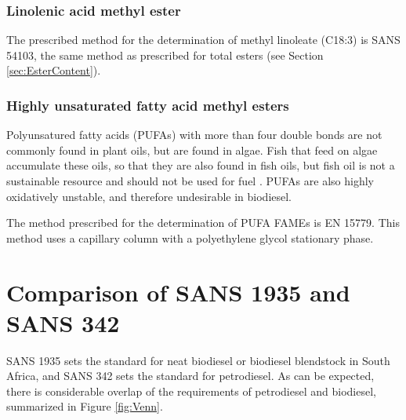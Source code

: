 \subsubsection{Linolenic acid methyl ester}

The prescribed method for the determination of methyl linoleate (C18:3) is SANS
54103, the same method as prescribed for total esters (see Section
\ref{sec:EsterContent}).

\subsubsection{Highly unsaturated fatty acid methyl esters}

Polyunsatured fatty acids (PUFAs) with more than four double bonds are not
commonly found in plant oils, but are found in algae. Fish that feed on algae
accumulate these oils, so that they are also found in fish oils, but fish oil is
not a sustainable resource and should not be used for fuel
\autocite{Kitessa2014}. PUFAs are also highly oxidatively unstable, and
therefore undesirable in biodiesel.

The method prescribed for the determination of PUFA FAMEs is EN 15779. This
method uses a capillary column with a polyethylene glycol stationary phase.

\section{Comparison of SANS 1935 and SANS 342}

SANS 1935 sets the standard for neat biodiesel or biodiesel blendstock in South
Africa, and SANS 342 sets the standard for petrodiesel. As can be expected,
there is considerable overlap of the requirements of petrodiesel and
biodiesel, summarized in Figure \ref{fig:Venn}.

